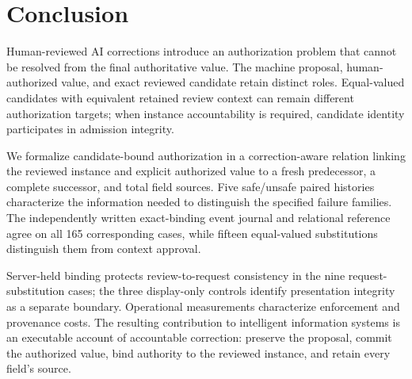 \section{Conclusion}
\label{sec:conclusion}
Human-reviewed AI corrections introduce an authorization problem that cannot be resolved from the final authoritative value. The machine proposal, human-authorized value, and exact reviewed candidate retain distinct roles. Equal-valued candidates with equivalent retained review context can remain different authorization targets; when instance accountability is required, candidate identity participates in admission integrity.

We formalize candidate-bound authorization in a correction-aware relation linking the reviewed instance and explicit authorized value to a fresh predecessor, a complete successor, and total field sources. Five safe/unsafe paired histories characterize the information needed to distinguish the specified failure families. The independently written exact-binding event journal and relational reference agree on all 165 corresponding cases, while fifteen equal-valued substitutions distinguish them from context approval.

Server-held binding protects review-to-request consistency in the nine request-substitution cases; the three display-only controls identify presentation integrity as a separate boundary. Operational measurements characterize enforcement and provenance costs. The resulting contribution to intelligent information systems is an executable account of accountable correction: preserve the proposal, commit the authorized value, bind authority to the reviewed instance, and retain every field's source.
